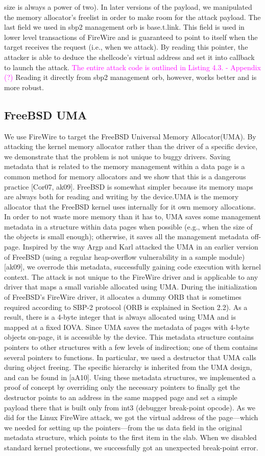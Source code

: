 size is always a power of two). In later versions of the payload, we manipulated the memory allocator’s freelist in order to make room for the attack payload. The last field we used in sbp2 management orb is base.t.link. This field is used in lower level transactions of FireWire and is guaranteed to point to itself when the target receives the request (i.e., when we attack). By reading this pointer, the attacker is able to deduce the shellcode’s virtual address and set it into callback to launch the attack. \textcolor{magenta}{The entire attack code is outlined in Listing 4.3. - Appendix (?) } Reading it directly from sbp2 management orb, however, works better and is more robust.
\subsection{FreeBSD UMA}
We use FireWire to target the FreeBSD Universal Memory Allocator(UMA). By attacking the kernel memory allocator rather than the driver of a specific device, we demonstrate that the problem is not unique to buggy drivers. Saving metadata that is related to the memory management within a data page is a common method for memory allocators and we show that this is a dangerous practice [Cor07, ak09]. FreeBSD is somewhat simpler because its memory maps are always both for reading and writing by the device.UMA is the memory allocator that the FreeBSD kernel uses internally for it own memory allocations. In order to not waste more memory than it has to, UMA saves some management metadata in a structure within data pages when possible (e.g., when the size of the objects is small enough); otherwise, it saves all the management metadata off-page. Inspired by the way Argp and Karl attacked the UMA in an earlier version of FreeBSD (using a regular heap-overflow vulnerability in a sample module) [ak09], we overrode this metadata, successfully gaining code execution with kernel context. The attack is not unique to the FireWire driver and is applicable to any driver that maps a small variable allocated using UMA. During the initialization of FreeBSD’s FireWire driver, it allocates a dummy ORB that is sometimes required according to SBP-2 protocol (ORB is explained in Section 2.2). As a result, there is a 4-byte integer that is always allocated using UMA and is mapped at a fixed IOVA. Since UMA saves the metadata of pages with 4-byte objects on-page, it is accessible by the device. This metadata structure contains pointers to other structures with a few levels of indirection; one of them contains several pointers to functions. In particular, we used a destructor that UMA calls during object freeing. The specific hierarchy is inherited from the UMA design, and can be found in [aA10]. Using these metadata structures, we implemented a proof of concept by overriding only the necessary pointers to finally get the destructor points to an address in the same mapped page and set a simple payload there that is built only from int3 (debugger break-point opcode). As we did for the Linux FireWire attack, we got the virtual address of the page—which we needed for setting up the pointers—from the us data field in the original metadata structure, which points to the first item in the slab. When we disabled standard kernel protections, we successfully got an unexpected break-point error.